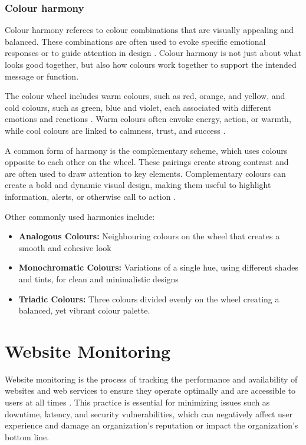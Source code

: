 \subsubsection{Colour harmony}
\label{subsubsec:colour_harmony}


Colour harmony referees to colour combinations that are visually appealing and balanced. These combinations are often used to evoke specific emotional responses or to guide attention in design \autocite{ParkUni}. Colour harmony is not just about what looks good together, but also how colours work together to support the intended message or function. 

The colour wheel includes warm colours, such as red, orange, and yellow, and cold colours, such as green, blue and violet, each associated with different emotions and reactions \autocite{Canva}. Warm colours often envoke energy, action, or warmth, while cool colours are linked to calmness, trust, and success \autocite{ParkUni}.

A common form of harmony is the complementary scheme, which uses colours opposite to each other on the wheel. These pairings create strong contrast and are often used to draw attention to key elements. Complementary colours can create a bold and dynamic visual design, making them useful to highlight information, alerts, or otherwise call to action \autocite{Canva}.

Other commonly used harmonies include:
\begin{itemize}
    \item \textbf{Analogous Colours:} Neighbouring colours on the wheel that creates a smooth and cohesive look
    \item \textbf{Monochromatic Colours:} Variations of a single hue, using different shades and tints, for clean and minimalistic designs
    \item \textbf{Triadic Colours:} Three colours divided evenly on the wheel creating a balanced, yet vibrant colour palette. 
\end{itemize}


\section{Website Monitoring}
\label{sec:website_monitoring}


Website monitoring is the process of tracking the performance and availability of websites and web services to ensure they operate optimally and are accessible to users at all times \autocite{IBMwebmonitor}. This practice is essential for minimizing issues such as downtime, latency, and security vulnerabilities, which can negatively affect user experience and damage an organization’s reputation or impact the organization’s bottom line.

